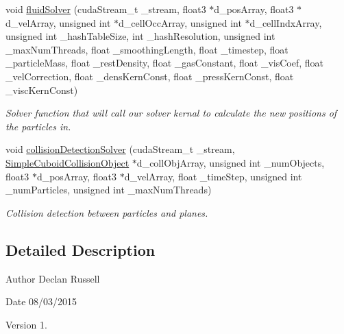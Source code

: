 \begin{DoxyCompactItemize}
void \hyperlink{_cuda_s_p_h_kernals_8cu_a59c1e6aa2f1fb9792cde8f2ab4eba1d5}{fluid\-Solver} (cuda\-Stream\-\_\-t \-\_\-stream, float3 $\ast$d\-\_\-pos\-Array, float3 $\ast$d\-\_\-vel\-Array, unsigned int $\ast$d\-\_\-cell\-Occ\-Array, unsigned int $\ast$d\-\_\-cell\-Indx\-Array, unsigned int \-\_\-hash\-Table\-Size, int \-\_\-hash\-Resolution, unsigned int \-\_\-max\-Num\-Threads, float \-\_\-smoothing\-Length, float \-\_\-timestep, float \-\_\-particle\-Mass, float \-\_\-rest\-Density, float \-\_\-gas\-Constant, float \-\_\-vis\-Coef, float \-\_\-vel\-Correction, float \-\_\-dens\-Kern\-Const, float \-\_\-press\-Kern\-Const, float \-\_\-visc\-Kern\-Const)
\begin{DoxyCompactList}\small\item\em Solver function that will call our solver kernal to calculate the new positions of the particles in. \end{DoxyCompactList}\item 
void \hyperlink{_cuda_s_p_h_kernals_8cu_a7a0632beb23e4ab002f75b630f13cdb8}{collision\-Detection\-Solver} (cuda\-Stream\-\_\-t \-\_\-stream, \hyperlink{struct_simple_cuboid_collision_object}{Simple\-Cuboid\-Collision\-Object} $\ast$d\-\_\-coll\-Obj\-Array, unsigned int \-\_\-num\-Objects, float3 $\ast$d\-\_\-pos\-Array, float3 $\ast$d\-\_\-vel\-Array, float \-\_\-time\-Step, unsigned int \-\_\-num\-Particles, unsigned int \-\_\-max\-Num\-Threads)
\begin{DoxyCompactList}\small\item\em Collision detection between particles and planes. \end{DoxyCompactList}\end{DoxyCompactItemize}


\subsection{Detailed Description}
\begin{DoxyAuthor}{Author}
Declan Russell 
\end{DoxyAuthor}
\begin{DoxyDate}{Date}
08/03/2015 
\end{DoxyDate}
\begin{DoxyVersion}{Version}
1. 
\end{DoxyVersion}



